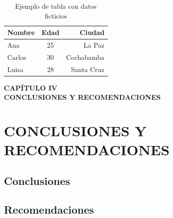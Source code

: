\documentclass[12pt,oneside,letterpaper]{book}
\begin{document}
\begin{table}[H]
\centering
\begin{tabular}{|l|c|r|}
\hline
Nombre & Edad & Ciudad \\
\hline
Ana & 25 & La Paz \\
Carlos & 30 & Cochabamba \\
Luisa & 28 & Santa Cruz \\
\hline
\end{tabular}
\caption{Ejemplo de tabla con datos ficticios}
\label{tab:ejemplo1}
\end{table}

\newpage
\thispagestyle{empty}
\vspace*{0.35\textheight}
\begin{center}
	{\Huge\textbf{CAPÍTULO IV}} \\[0.5cm]
	{\Huge\textbf{CONCLUSIONES Y RECOMENDACIONES}}
\end{center}

\newpage
\chapter{CONCLUSIONES Y RECOMENDACIONES}
\thispagestyle{fancy}

\section{Conclusiones}
\lipsum[1]

\section{Recomendaciones}
\lipsum[1]

\printbibliography[
	heading=bibintoc,
	title={BIBLIOGRAFÍA}
]
\end{document}
